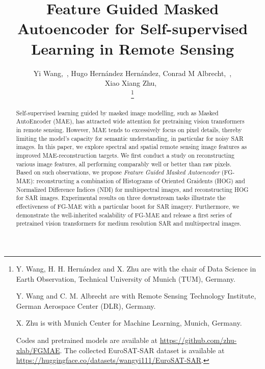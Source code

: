 \documentclass[lettersize,journal]{IEEEtran}
\begin{document}
\title{Feature Guided Masked Autoencoder for Self-supervised Learning in Remote Sensing
}

\author{Yi Wang,~, Hugo Hernández Hernández, Conrad M Albrecht,~, \\ Xiao Xiang Zhu,~

\thanks{Y. Wang, H. H. Hernández and X. Zhu are with the chair of Data Science in Earth Observation, Technical University of Munich (TUM), Germany.

Y. Wang and C. M. Albrecht are with Remote Sensing Technology Institute, German Aerospace Center (DLR), Germany.

X. Zhu is with Munich Center for Machine Learning, Munich, Germany.

Codes and pretrained models are available at \url{https://github.com/zhu-xlab/FGMAE}. The collected EuroSAT-SAR dataset is available at \url{https://huggingface.co/datasets/wangyi111/EuroSAT-SAR}.
}
}








\maketitle
\begin{abstract}
Self-supervised learning guided by masked image modelling, such as Masked AutoEncoder (MAE), has attracted wide attention for pretraining vision transformers in remote sensing. However, MAE tends to excessively focus on pixel details, thereby limiting the model's capacity for semantic understanding, in particular for noisy SAR images. In this paper, we explore spectral and spatial remote sensing image features as improved MAE-reconstruction targets. We first conduct a study on reconstructing various image features, all performing comparably well or better than raw pixels. Based on such observations, we propose \textit{Feature Guided Masked Autoencoder} (FG-MAE): reconstructing a combination of Histograms of Oriented Graidents (HOG) and Normalized Difference Indices (NDI) for multispectral images, and reconstructing HOG for SAR images. Experimental results on three downstream tasks illustrate the effectiveness of FG-MAE with a particular boost for SAR imagery. Furthermore, we demonstrate the well-inherited scalability of FG-MAE and release a first series of pretrained vision transformers for medium resolution SAR and multispectral images.
\end{abstract}
\end{document}
